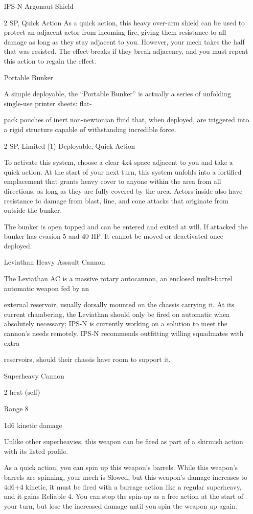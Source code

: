 IPS-N Argonaut Shield

2 SP, Quick Action
As a quick action, this heavy over-arm shield can be used to protect an adjacent actor from
incoming fire, giving them resistance to all damage as long as they stay adjacent to you.
However, your mech takes the half that was resisted. The effect breaks if they break adjacency,
and you must repeat this action to regain the effect.


Portable Bunker


A simple deployable, the “Portable Bunker” is actually a series of unfolding single-use printer sheets: flat-

pack pouches of inert non-newtonian fluid that, when deployed, are triggered into a rigid structure capable
of withstanding incredible force.

2 SP, Limited (1)
Deployable, Quick Action

To activate this system, choose a clear 4x4 space adjacent to you and take a quick action. At the
start of your next turn, this system unfolds into a fortified emplacement that grants heavy cover
to anyone within the area from all directions, as long as they are fully covered by the area. Actors
inside also have resistance to damage from blast, line, and cone attacks that originate from
outside the bunker.


The bunker is open topped and can be entered and exited at will. If attacked the bunker has
evasion 5 and 40 HP. It cannot be moved or deactivated once deployed.





Leviathan Heavy Assault Cannon

The Leviathan AC is a massive rotary autocannon, an enclosed multi-barrel automatic weapon fed by an

external reservoir, usually dorsally mounted on the chassis carrying it. At its current chambering, the
Leviathan should only be fired on automatic when absolutely necessary; IPS-N is currently working on a
solution to meet the cannon’s needs remotely. IPS-N recommends outfitting willing squadmates with extra

reservoirs, should their chassis have room to support it.

Superheavy Cannon

2 heat (self)

Range 8

1d6 kinetic damage


Unlike other superheavies, this weapon can be fired as part of a skirmish action with its listed
profile.

As a quick action, you can spin up this weapon’s barrels. While this weapon’s barrels are
spinning, your mech is Slowed, but this weapon’s damage increases to 4d6+4 kinetic, it must be
fired with a barrage action like a regular superheavy, and it gains Reliable 4. You can stop the
spin-up as a free action at the start of your turn, but lose the increased damage until you spin the
weapon up again.
